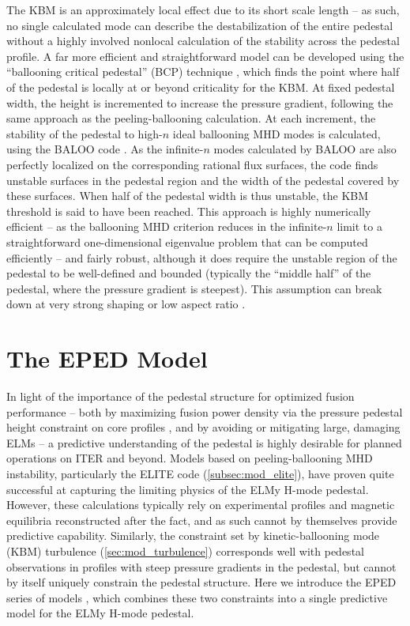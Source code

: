 The KBM is an approximately local effect due to its short scale length -- as such, no single calculated mode can describe the destabilization of the entire pedestal without a highly involved nonlocal calculation of the stability across the pedestal profile.  A far more efficient and straightforward model can be developed using the ``ballooning critical pedestal'' (BCP) technique \cite{Snyder2010,Snyder2011}, which finds the point where half of the pedestal is locally at or beyond criticality for the KBM.  At fixed pedestal width, the height is incremented to increase the pressure gradient, following the same approach as the peeling-ballooning calculation.  At each increment, the stability of the pedestal to high-$n$ ideal ballooning MHD modes is calculated, \eg using the BALOO code \cite{Connor1979,Miller1987}.  As the infinite-$n$ modes calculated by BALOO are also perfectly localized on the corresponding rational flux surfaces, the code finds unstable surfaces in the pedestal region and the 
width of the pedestal covered by these surfaces.  When half of the pedestal width is thus unstable, the KBM threshold is said to have been reached.  This approach is highly numerically efficient -- as the ballooning MHD criterion reduces in the infinite-$n$ limit to a straightforward one-dimensional eigenvalue problem \cite{Connor1979} that can be computed efficiently -- and fairly robust, although it does require the unstable region of the pedestal to be well-defined and bounded (typically the ``middle half'' of the pedestal, where the pressure gradient is steepest).  This assumption can break down at very strong shaping or low aspect ratio \cite{Snyder2011}.\nicesectionending

\section{The EPED Model}\label{sec:mod_eped}

In light of the importance of the pedestal structure for optimized fusion performance -- both by maximizing fusion power density via the pressure pedestal height constraint on core profiles \cite{Kinsey2011}, and by avoiding or mitigating large, damaging ELMs \cite{Loarte2003,Federici2003} -- a predictive understanding of the pedestal is highly desirable for planned operations on ITER and beyond.  Models based on peeling-ballooning MHD instability, particularly the ELITE code (\cref{subsec:mod_elite}), have proven quite successful at capturing the limiting physics of the ELMy H-mode pedestal.  However, these calculations typically rely on experimental profiles and magnetic equilibria reconstructed after the fact, and as such cannot by themselves provide predictive capability.  Similarly, the constraint set by kinetic-ballooning mode (KBM) turbulence (\cref{sec:mod_turbulence}) corresponds well with pedestal observations in profiles with steep pressure gradients in the pedestal, but cannot by itself uniquely 
constrain the pedestal structure.  Here we introduce the EPED series of models \cite{Snyder2011}, which combines these two constraints into a single predictive model for the ELMy H-mode pedestal.

